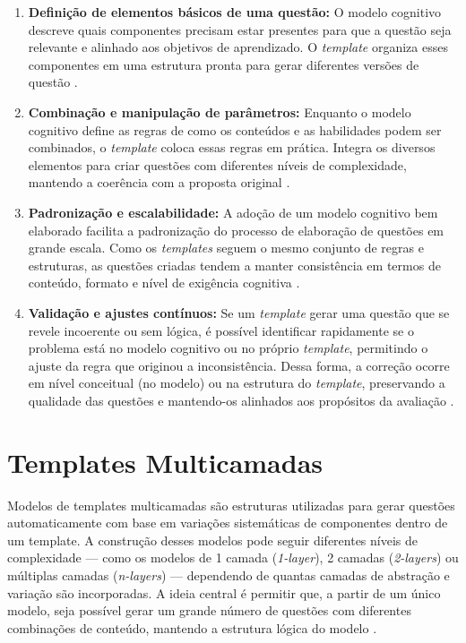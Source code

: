 \begin{enumerate} \item \textbf{Definição de elementos básicos de uma questão:} O modelo cognitivo descreve quais componentes  precisam estar presentes para que a questão seja relevante e alinhado aos objetivos de aprendizado. O \textit{template} organiza esses componentes em uma estrutura pronta para gerar diferentes versões de questão \parencite{lane2016}.

\item \textbf{Combinação e manipulação de parâmetros:}
Enquanto o modelo cognitivo define as regras de como os conteúdos e as habilidades podem ser combinados, o \textit{template} coloca essas regras em prática. Integra os diversos elementos para criar questões com diferentes níveis de complexidade, mantendo a coerência com a proposta original \parencite{embretson2017}.

\item \textbf{Padronização e escalabilidade:}
A adoção de um modelo cognitivo bem elaborado facilita a padronização do processo de elaboração de questões em grande escala. Como os \textit{templates} seguem o mesmo conjunto de regras e estruturas, as questões criadas tendem a manter consistência em termos de conteúdo, formato e nível de exigência cognitiva \parencite{gierl2017}.

\item \textbf{Validação e ajustes contínuos:}
Se um \textit{template} gerar uma questão que se revele incoerente ou sem lógica, é possível identificar rapidamente se o problema está no modelo cognitivo ou no próprio \textit{template}, permitindo o ajuste da regra que originou a inconsistência. Dessa forma, a correção ocorre em nível conceitual (no modelo) ou na estrutura do \textit{template}, preservando a qualidade das questões e mantendo-os alinhados aos propósitos da avaliação \parencite{gierlbulutzhang2018}.
\end{enumerate}


\section{Templates Multicamadas}

Modelos de templates multicamadas são estruturas utilizadas para gerar questões automaticamente com base em variações sistemáticas de componentes dentro de um template. A construção desses modelos pode seguir diferentes níveis de complexidade — como os modelos de 1 camada (\textit{1-layer}), 2 camadas (\textit{2-layers}) ou múltiplas camadas (\textit{n-layers}) — dependendo de quantas camadas de abstração e variação são incorporadas. A ideia central é permitir que, a partir de um único modelo, seja possível gerar um grande número de questões com diferentes combinações de conteúdo, mantendo a estrutura lógica do modelo . 


